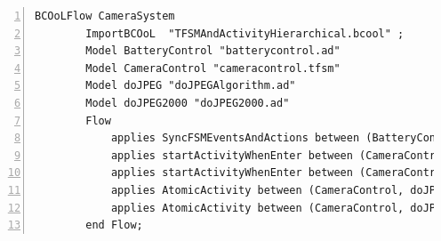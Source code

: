 	
	
		\begin{lstlisting}[language=bflow,
		caption={\bflow specification for the Surveillance Camera System},
		label={lst:bflowcamerasystem}, 
		basicstyle=\scriptsize\ttfamily, backgroundcolor=\color{LGrey}, numbers=left, xleftmargin=2pt]
		BCOoLFlow CameraSystem
		ImportBCOoL  "TFSMAndActivityHierarchical.bcool" ;
		Model BatteryControl "batterycontrol.ad"
		Model CameraControl "cameracontrol.tfsm"
		Model doJPEG "doJPEGAlgorithm.ad"
		Model doJPEG2000 "doJPEG2000.ad"
		Flow 
			applies SyncFSMEventsAndActions between (BatteryControl, CameraControl);
			applies startActivityWhenEnter between (CameraControl, doJPEG);
			applies startActivityWhenEnter between (CameraControl, doJPEG2000);
			applies AtomicActivity between (CameraControl, doJPEG);		
			applies AtomicActivity between (CameraControl, doJPEG2000);		
		end Flow;
		\end{lstlisting}